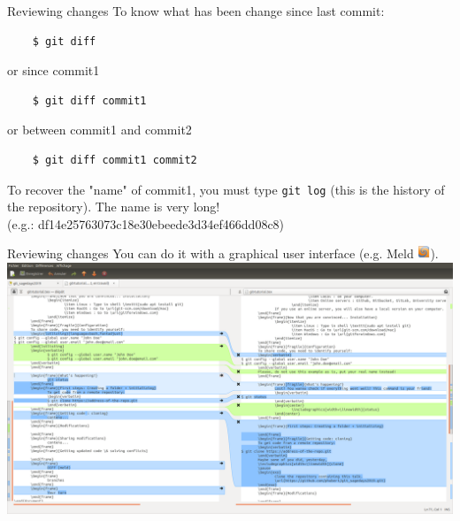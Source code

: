 \documentclass{beamer}
\begin{document}
	\begin{frame}[fragile]{Reviewing changes}
	To know what has been change since last commit:
	\begin{verbatim}
	$ git diff
	\end{verbatim}
	or since commit1 
	\begin{verbatim}
	$ git diff commit1
	\end{verbatim}
	or between commit1 and commit2
	\begin{verbatim}
	$ git diff commit1 commit2
	\end{verbatim}
	\begin{tcolorbox}[colback=cyan!30]
	To recover the "name" of commit1, you must type \texttt{git log} (this is the history of the repository). The name is very long!\\
	(e.g.: df14e25763073c18e30ebeede3d34ef466dd08c8)
	\end{tcolorbox}
	\end{frame}

	\begin{frame}{Reviewing changes}
	You can do it with a graphical user interface (e.g. Meld \includegraphics[height=1em]{meld_logo}).\\
	\vspace{1em}
	\includegraphics[width=\linewidth]{meld_ps}
	\end{frame}
\end{document}
